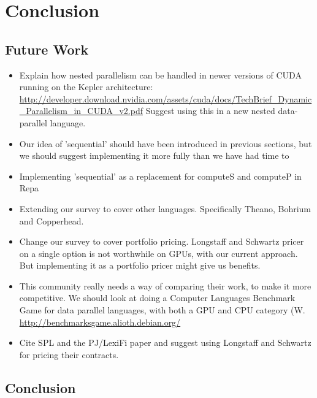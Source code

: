 

\chapter{Conclusion}
\section{Future Work}

\begin{itemize}
\item Explain how nested parallelism can be handled in newer versions
  of CUDA running on the Kepler architecture:
  \url{http://developer.download.nvidia.com/assets/cuda/docs/TechBrief_Dynamic_Parallelism_in_CUDA_v2.pdf}
  Suggest using this in a new nested data-parallel language.

\item Our idea of 'sequential' should have been introduced in previous
  sections, but we should suggest implementing it more fully than we
  have had time to

\item Implementing 'sequential' as a replacement for computeS and
  computeP in Repa

\item Extending our survey to cover other languages. Specifically
  Theano, Bohrium and Copperhead.

\item Change our survey to cover portfolio pricing. Longstaff and
  Schwartz pricer on a single option is not worthwhile on GPUs, with
  our current approach. But implementing it as a portfolio pricer
  might give us benefits.

\item This community really needs a way of comparing their work, to
  make it more competitive. We should look at doing a Computer
  Languages Benchmark Game for data parallel languages, with both a
  GPU and CPU category (W. \url{http://benchmarksgame.alioth.debian.org/}

\item Cite SPL and the PJ/LexiFi paper and suggest using Longstaff and
  Schwartz for pricing their contracts.
\end{itemize}

\section{Conclusion}


